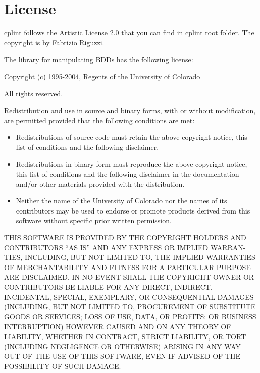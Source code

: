 \documentclass[letterpaper,10pt,english]{sphinxmanual}
\begin{document}
\chapter{License}
\label{\detokenize{index:license}}
cplint follows the Artistic License 2.0 that you can find in cplint root folder.
The copyright is by Fabrizio Riguzzi.

The library  for manipulating BDDs has the following license:

Copyright (c) 1995-2004, Regents of the University of Colorado

All rights reserved.

Redistribution and use in source and binary forms, with or without
modification, are permitted provided that the following conditions
are met:
\begin{itemize}
\item {} 
Redistributions of source code must retain the above copyright notice, this list of conditions and the following disclaimer.

\item {} 
Redistributions in binary form must reproduce the above copyright notice, this list of conditions and the following disclaimer in the documentation and/or other materials provided with the distribution.

\item {} 
Neither the name of the University of Colorado nor the names of its contributors may be used to endorse or promote products derived from this software without specific prior written permission.

\end{itemize}

THIS SOFTWARE IS PROVIDED BY THE COPYRIGHT HOLDERS AND CONTRIBUTORS
“AS IS” AND ANY EXPRESS OR IMPLIED WARRAN-TIES, INCLUDING, BUT NOT
LIMITED TO, THE IMPLIED WARRANTIES OF MERCHANTABILITY AND FITNESS
FOR A PARTICULAR PURPOSE ARE DISCLAIMED. IN NO EVENT SHALL THE
COPYRIGHT OWNER OR CONTRIBUTORS BE LIABLE FOR ANY DIRECT, INDIRECT,
INCIDENTAL, SPECIAL, EXEMPLARY, OR CONSEQUENTIAL DAMAGES (INCLUDING,
BUT NOT LIMITED TO, PROCUREMENT OF SUBSTITUTE GOODS OR SERVICES;
LOSS OF USE, DATA, OR PROFITS; OR BUSINESS INTERRUPTION) HOWEVER
CAUSED
AND ON ANY THEORY OF LIABILITY, WHETHER IN CONTRACT, STRICT
LIABILITY, OR TORT (INCLUDING NEGLIGENCE OR OTHERWISE) ARISING IN
ANY WAY OUT OF THE USE OF THIS SOFTWARE, EVEN IF ADVISED OF THE
POSSIBILITY OF SUCH DAMAGE.
\end{document}
